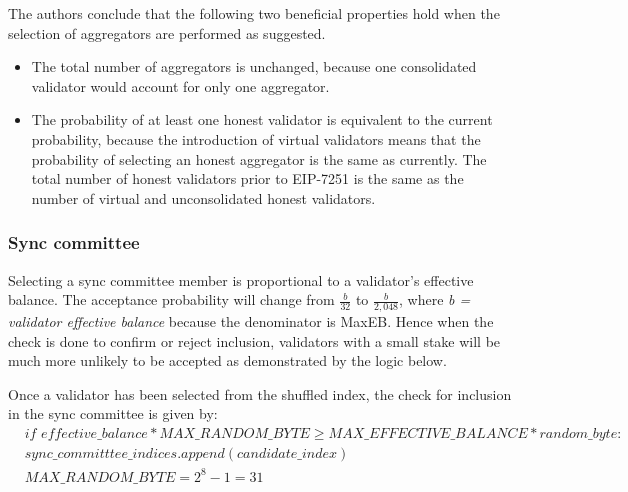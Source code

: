 \documentclass[UTF8]{article}
\begin{document}

The authors conclude that the following two beneficial properties hold when the selection of aggregators are performed as suggested.

\begin{itemize}
\item The total number of aggregators is unchanged, because one consolidated validator would account for only one aggregator.
\item The probability of at least one honest validator is equivalent to the current probability, because the introduction of virtual validators means that the probability of selecting an honest aggregator is the same as currently. The total number of honest validators prior to EIP-7251 is the same as the number of virtual and unconsolidated honest validators.
\end{itemize}

\subsubsection*{Sync committee}
Selecting a sync committee member is proportional to a validator's effective balance. The acceptance probability will change from $\frac{b}{32}$ to $\frac{b}{2,048}$, where \textit{b = validator effective balance} because the denominator is MaxEB. Hence when the check is done to confirm or reject inclusion, validators with a small stake will be much more unlikely to be accepted as demonstrated by the logic below. 

Once a validator has been selected from the shuffled index, the check for inclusion in the sync committee is given by:
\begin{equation*}
\begin{split}
& \textit{if effective\_balance} * \textit{MAX\_RANDOM\_BYTE} \geqslant \textit{MAX\_EFFECTIVE\_BALANCE} * random\_byte:\\
& sync\_committtee\_indices.append(candidate\_index)\\
& \textit{MAX\_RANDOM\_BYTE} = 2^8 - 1 = 31\\
\end{split}
\end{equation*}
\end{document}
